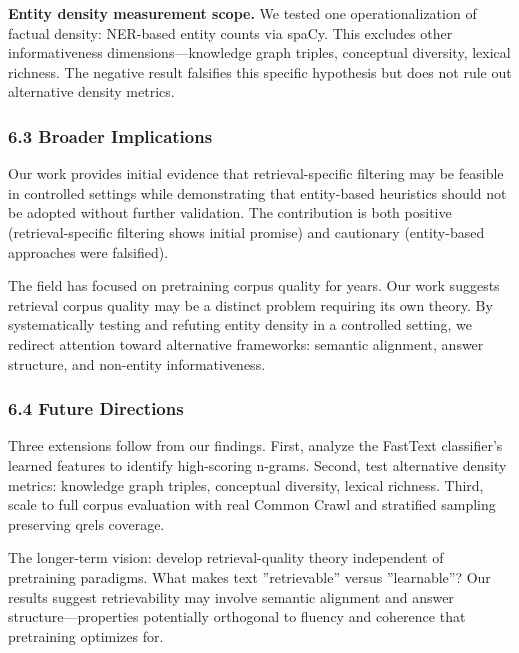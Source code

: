 \textbf{Entity density measurement scope.} We tested one operationalization of factual density: NER-based entity counts via spaCy. This excludes other informativeness dimensions---knowledge graph triples, conceptual diversity, lexical richness. The negative result falsifies this specific hypothesis but does not rule out alternative density metrics.

\subsubsection{6.3 Broader Implications}

Our work provides initial evidence that retrieval-specific filtering may be feasible in controlled settings while demonstrating that entity-based heuristics should not be adopted without further validation. The contribution is both positive (retrieval-specific filtering shows initial promise) and cautionary (entity-based approaches were falsified).

The field has focused on pretraining corpus quality for years. Our work suggests retrieval corpus quality may be a distinct problem requiring its own theory. By systematically testing and refuting entity density in a controlled setting, we redirect attention toward alternative frameworks: semantic alignment, answer structure, and non-entity informativeness.

\subsubsection{6.4 Future Directions}

Three extensions follow from our findings. First, analyze the FastText classifier's learned features to identify high-scoring n-grams. Second, test alternative density metrics: knowledge graph triples, conceptual diversity, lexical richness. Third, scale to full corpus evaluation with real Common Crawl and stratified sampling preserving qrels coverage.

The longer-term vision: develop retrieval-quality theory independent of pretraining paradigms. What makes text ''retrievable'' versus ''learnable''? Our results suggest retrievability may involve semantic alignment and answer structure---properties potentially orthogonal to fluency and coherence that pretraining optimizes for.
